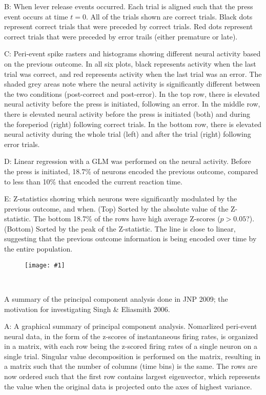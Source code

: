 \documentclass[12pt]{article}
\newcommand{\scalefigone}[3]{
  \begin{figure}[ht!]
    \centering
    \texttt{[image: \#1]}
    \caption{#3}
    \label{#1}
  \end{figure}}
\begin{document}
B: When lever release events occurred.
Each trial is aligned such that the press event
occurs at time $t=0$.
All of the trials shown are correct trials.
Black dots represent correct trials
that were preceded by correct trials.
Red dots represent correct trials
that were preceded by error trails
(either premature or late).

C: Peri-event spike rasters and histograms
showing different neural activity
based on the previous outcome.
In all six plots, black represents activity
when the last trial was correct, and red
represents activity when the last trial was an error.
The shaded grey areas note where
the neural activity is significantly different
between the two conditions (post-correct and post-error).
In the top row, there is elevated neural activity
before the press is initiated, following an error.
In the middle row, there is elevated neural activity
before the press is initiated (both)
and during the foreperiod (right)
following correct trials.
In the bottom row, there is elevated neural activity
during the whole trial (left)
and after the trial (right)
following error trials.

D: Linear regression with a GLM was performed
on the neural activity.
Before the press is initiated,
18.7\% of neurons encoded the previous outcome,
compared to less than 10\% that
encoded the current reaction time. %

E: Z-statistics showing which neurons were significantly
modulated by the previous outcome, and when.
(Top) Sorted by the absolute value of the Z-statistic.
The bottom 18.7\% of the rows have high average Z-scores
($p > 0.05$?). %
(Bottom) Sorted by the peak of the Z-statistic.
The line is close to linear, suggesting that the
previous outcome information is being encoded over time
by the entire population. %

\clearpage

\scalefigone{f2.png}{1.0}{~}

A summary of the principal component analysis done
in JNP 2009;
the motivation for investigating Singh \& Eliasmith 2006.

A: A graphical summary of principal component analysis.
Nomarlized peri-event neural data,
in the form of the z-scores of instantaneous firing rates,
is organized in a matrix, with each row
being the z-scored firing rates
of a single neuron on a single trial.
Singular value decomposition is performed on the matrix,
resulting in a matrix such that
the number of columns (time bins) is the same.
The rows are now ordered such that the first row
contains largest eigenvector,
which represents the value when the original
data is projected onto the axes of highest variance.
\end{document}
